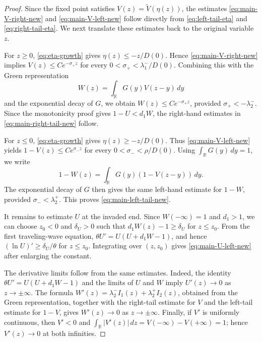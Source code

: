 \documentclass[preprint,sort&compress,final,12pt]{elsarticle}
\numberwithin{equation}{section}
\begin{document}
\begin{proof}
Since the fixed point satisfies $V(z)=\widetilde V(\eta(z))$, the estimates \eqref{eq:main-V-right-new} and \eqref{eq:main-V-left-new} follow directly from \eqref{eq:left-tail-eta} and \eqref{eq:right-tail-eta}. We next translate these estimates back to the original variable $z$.

For $z\ge0$, \eqref{eq:eta-growth} gives $\eta(z)\le -z/D(0)$. Hence \eqref{eq:main-V-right-new} implies $V(z)\le Ce^{-\sigma_+z}$ for every $0<\sigma_+<\lambda_1^-/D(0)$. Combining this with the Green representation
\begin{equation*}
W(z)=\int_{\mathbb R}G(y)V(z-y)\,dy
\end{equation*}
and the exponential decay of $G$, we obtain $W(z)\le Ce^{-\sigma_+z}$, provided $\sigma_+<-\lambda_2^-$. Since the monotonicity proof gives $1-U<d_1W$, the right-hand estimates in \eqref{eq:main-right-tail-new} follow.

For $z\le0$, \eqref{eq:eta-growth} gives $\eta(z)\ge -z/D(0)$. Thus \eqref{eq:main-V-left-new} yields $1-V(z)\le Ce^{\sigma_-z}$ for every $0<\sigma_-<\rho/D(0)$. Using $\int_{\mathbb R}G(y)\,dy=1$, we write
\begin{equation*}
1-W(z)=\int_{\mathbb R}G(y)(1-V(z-y))\,dy.
\end{equation*}
The exponential decay of $G$ then gives the same left-hand estimate for $1-W$, provided $\sigma_-<\lambda_2^+$. This proves \eqref{eq:main-left-tail-new}.

It remains to estimate $U$ at the invaded end. Since $W(-\infty)=1$ and $d_1>1$, we can choose $z_0<0$ and $\delta_U>0$ such that $d_1W(z)-1\ge\delta_U$ for $z\le z_0$. From the first traveling-wave equation, $\theta U'=U(U+d_1W-1)$, and hence $(\ln U)'\ge\delta_U/\theta$ for $z\le z_0$. Integrating over $(z,z_0)$ gives \eqref{eq:main-U-left-new} after enlarging the constant.

The derivative limits follow from the same estimates. Indeed, the identity $\theta U'=U(U+d_1W-1)$ and the limits of $U$ and $W$ imply $U'(z)\to0$ as $z\to\pm\infty$. The formula $W'(z)=\lambda_2^-I_1(z)+\lambda_2^+I_2(z)$, obtained from the Green representation, together with the right-tail estimate for $V$ and the left-tail estimate for $1-V$, gives $W'(z)\to0$ as $z\to\pm\infty$. Finally, if $V'$ is uniformly continuous, then $V'<0$ and $\int_{\mathbb R}|V'(z)|\,dz=V(-\infty)-V(+\infty)=1$; hence $V'(z)\to0$ at both infinities.
\end{proof}
\end{document}
